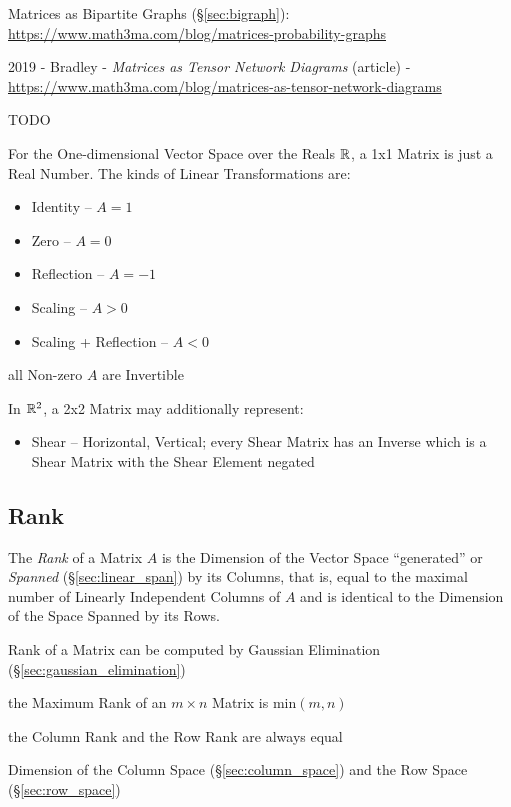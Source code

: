 Matrices as Bipartite Graphs (\S\ref{sec:bigraph}):
\url{https://www.math3ma.com/blog/matrices-probability-graphs}

2019 - Bradley - \emph{Matrices as Tensor Network Diagrams} (article) -
\url{https://www.math3ma.com/blog/matrices-as-tensor-network-diagrams}

\asterism

TODO

For the One-dimensional Vector Space over the Reals $\mathbb{R}$, a 1x1 Matrix is
just a Real Number. The kinds of Linear Transformations are:
\begin{itemize}
  \item Identity -- $A = 1$
  \item Zero -- $A = 0$
  \item Reflection -- $A = -1$
  \item Scaling -- $A > 0$
  \item Scaling + Reflection -- $A < 0$
\end{itemize}
all Non-zero $A$ are Invertible

In $\mathbb{R}^2$, a 2x2 Matrix may additionally represent:
\begin{itemize}
  \item Shear -- Horizontal, Vertical; every Shear Matrix has an Inverse which
    is a Shear Matrix with the Shear Element negated
\end{itemize}



\subsection{Rank}\label{sec:rank}

The \emph{Rank} of a Matrix $A$ is the Dimension of the Vector Space
``generated'' or \emph{Spanned} (\S\ref{sec:linear_span}) by its Columns, that
is, equal to the maximal number of Linearly Independent Columns of $A$ and is
identical to the Dimension of the Space Spanned by its Rows.

\fist Rank of a Matrix can be computed by Gaussian Elimination
(\S\ref{sec:gaussian_elimination})

the Maximum Rank of an $m \times n$ Matrix is $\mathrm{min}(m,n)$

the Column Rank and the Row Rank are always equal

Dimension of the Column Space (\S\ref{sec:column_space}) and the Row Space
(\S\ref{sec:row_space})

